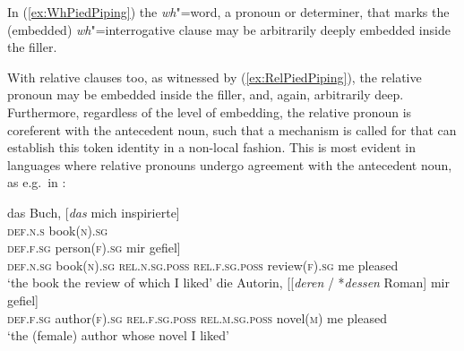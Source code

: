 \documentclass[output=paper
,notxmath 
 	        ,biblatex
                ,babelshorthands
                ,newtxmath
                ,draftmode
                ,colorlinks, citecolor=brown
]{langscibook}
\begin{document}
\begin{exe}
  \ex \label{ex:RelPiedPiping}
  \begin{xlist}
  \end{xlist}
\end{exe}

\noindent
In (\ref{ex:WhPiedPiping}) the \emph{wh}"=word, a pronoun or determiner, that
marks the (embedded) \emph{wh}"=interrogative clause may be arbitrarily deeply embedded inside the filler.  

With relative clauses too, as witnessed by (\ref{ex:RelPiedPiping}), the
relative pronoun may be embedded inside the filler, and, again,
arbitrarily deep. Furthermore, regardless of the level of embedding,
the relative pronoun is coreferent with the antecedent noun, such that
a mechanism is called for that can establish this token identity in a
non-local fashion. This is most evident in languages where relative
pronouns undergo agreement with the antecedent noun, as e.g.\ in
:

\eal
\ex
\gll das Buch, [\textit{das} mich inspirierte]\\
     \textsc{def.n.s} book(\textsc{n})\textsc{.sg} \hphantom[\textsc{rel.n.sg} me inspired\\
\glt `the book that inspired me'
\ex
\gll die Person, [\textit{die} mich inspirierte]\\
     \textsc{def.f.sg} person(\textsc{f})\textsc{.sg} \hphantom[\textsc{rel.f.sg} me inspired\\   
\glt `the person that inspired me'
\ex
\gll das Buch, [[\textit{dessen} / *\textit{deren} Rezension] mir gefiel]\\
     \textsc{def.n.sg} book(\textsc{n})\textsc{.sg} \hphantom{[[}\textsc{rel.n.sg.poss} {} \hphantom{*}\textsc{rel.f.sg.poss} review(\textsc{f}).\textsc{sg} me pleased\\
\glt `the book the review of which I liked'
\ex
\gll die Autorin, [[\textit{deren} / *\textit{dessen} Roman] mir gefiel]\\
     \textsc{def.f.sg} author(\textsc{f})\textsc{.sg} \hphantom{[[}\textsc{rel.f.sg.poss} {} \hphantom{*}\textsc{rel.m.sg.poss} novel(\textsc{m}) me pleased\\
\glt `the (female) author whose novel I liked'
\zl
\end{document}
